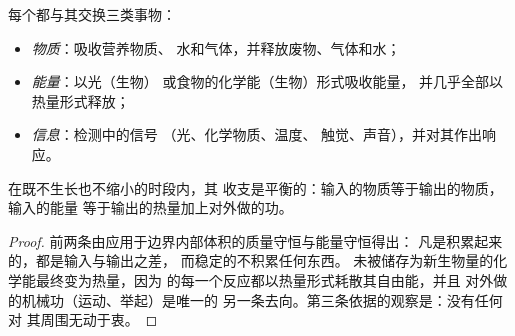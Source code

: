 \begin{proposition}[三种交换]\label{prop:b1:organism-environment:exchanges}
每个都与其交换三类事物：
\begin{itemize}
  \item \emph{物质}：吸收营养物质、
        水和气体，并释放废物、气体和水；
  \item \emph{能量}：以光（生物）
        或食物的化学能（生物）形式吸收能量，
        并几乎全部以热量形式释放；
  \item \emph{信息}：检测中的信号
        （光、化学物质、温度、
        触觉、声音），并对其作出响应。
\end{itemize}
在既不生长也不缩小的时段内，其
收支是平衡的：输入的物质等于输出的物质，输入的能量
等于输出的热量加上对外做的功。
\end{proposition}
\begin{proof}
前两条由应用于边界内部体积的质量守恒与能量守恒得出：
凡是积累起来的，都是输入与输出之差，
而稳定的不积累任何东西。
未被储存为新生物量的化学能最终变为热量，因为
的每一个反应都以热量形式耗散其自由能，并且
对外做的机械功（运动、举起）是唯一的
另一条去向。第三条依据的观察是：没有任何对
其周围无动于衷。
\end{proof}


